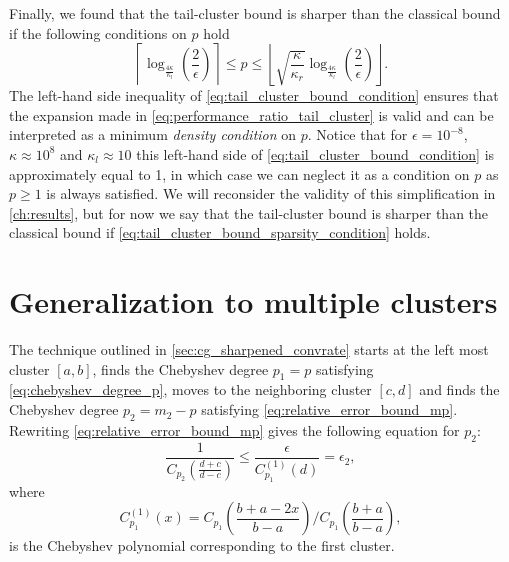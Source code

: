 Finally, we found that the tail-cluster bound is sharper than the classical bound if the following conditions on $p$ hold
\begin{equation}
    \left\lceil\log_{\frac{4\kappa}{\kappa_l}}\left(\frac{2}{\epsilon}\right)\right\rceil \leq p \leq \left\lfloor\sqrt{\frac{\kappa}{\kappa_r}}\log_{\frac{4\kappa}{\kappa_l}}\left(\frac{2}{\epsilon}\right)\right\rfloor.
    \label{eq:tail_cluster_bound_condition}
\end{equation}
The left-hand side inequality of \cref{eq:tail_cluster_bound_condition} ensures that the expansion made in \cref{eq:performance_ratio_tail_cluster} is valid and can be interpreted as a minimum \textit{density condition} on $p$. Notice that for $\epsilon = 10^{-8}$, $\kappa\approx 10^{8}$ and $\kappa_l\approx 10$ this left-hand side of \cref{eq:tail_cluster_bound_condition} is approximately equal to 1, in which case we can neglect it as a condition on $p$ as $p\geq 1$ is always satisfied. We will reconsider the validity of this simplification in \cref{ch:results}, but for now we say that the tail-cluster bound is sharper than the classical bound if \cref{eq:tail_cluster_bound_sparsity_condition} holds.

\section{Generalization to multiple clusters}\label{sec:multiple_clusters}
The technique outlined in \cref{sec:cg_sharpened_convrate} starts at the left most cluster $[a,b]$, finds the Chebyshev degree $p_1=p$ satisfying \cref{eq:chebyshev_degree_p}, moves to the neighboring cluster $[c,d]$ and finds the Chebyshev degree $p_2 = m_2 - p$ satisfying \cref{eq:relative_error_bound_mp}. Rewriting \cref{eq:relative_error_bound_mp} gives the following equation for $p_2$:
\begin{equation}
    \frac{1}{C_{p_2}\left(\frac{d+c}{d-c}\right)} \leq \frac{\epsilon}{{C}^{(1)}_{p_1}(d)} = \epsilon_2,
    \label{eq:chebyshev_degree_p_prime}
\end{equation}
where
\[
    C^{(1)}_{p_1}(x) = C_{p_1}\left(\frac{b + a - 2x}{b - a}\right) /C_{p_1}\left(\frac{b+a}{b-a}\right),
\]
is the Chebyshev polynomial corresponding to the first cluster.


